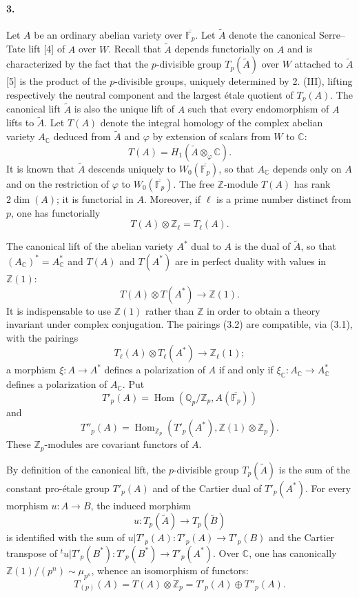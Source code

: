 \documentclass[10pt]{article}
\newcommand{\C}{\mathbb C}
\newcommand{\Fp}{\mathbb F_p}
\newcommand{\Q}{\mathbb Q}
\newcommand{\Z}{\mathbb Z}
\newcommand{\Ac}{A_{\C}}
\newcommand{\Hom}{\operatorname{Hom}}
\begin{document}
\paragraph{3.} Let $A$ be an ordinary abelian variety over $\overline{\Fp}$. Let $\widetilde A$ denote the canonical Serre--Tate lift [4] of $A$ over $W$. Recall that $\widetilde A$ depends functorially on $A$ and is characterized by the fact that the $p$-divisible group $T_p(\widetilde A)$ over $W$ attached to $\widetilde A$ [5] is the product of the $p$-divisible groups, uniquely determined by 2. (III), lifting respectively the neutral component and the largest étale quotient of $T_p(A)$. The canonical lift $\widetilde A$ is also the unique lift of $A$ such that every endomorphism of $A$ lifts to $\widetilde A$. Let $T(A)$ denote the integral homology of the complex abelian variety $\Ac$ deduced from $\widetilde A$ and $\varphi$ by extension of scalars from $W$ to $\C$:
\[
T(A)=H_1(\widetilde A\otimes_{\varphi}\C).
\]
It is known that $\widetilde A$ descends uniquely to $W_0(\overline{\Fp})$, so that $\Ac$ depends only on $A$ and on the restriction of $\varphi$ to $W_0(\overline{\Fp})$. The free $\Z$-module $T(A)$ has rank $2\dim(A)$; it is functorial in $A$. Moreover, if $\ell$ is a prime number distinct from $p$, one has functorially
\[
\tag{3.1}
T(A)\otimes\Z_\ell=T_\ell(A).
\]

The canonical lift of the abelian variety $A^*$ dual to $A$ is the dual of $\widetilde A$, so that $(\Ac)^*=A^*_{\C}$ and $T(A)$ and $T(A^*)$ are in perfect duality with values in $\Z(1)$:
\[
\tag{3.2}
T(A)\otimes T(A^*)\longrightarrow\Z(1).
\]
It is indispensable to use $\Z(1)$ rather than $\Z$ in order to obtain a theory invariant under complex conjugation. The pairings (3.2) are compatible, via (3.1), with the pairings
\[
T_\ell(A)\otimes T_\ell(A^*)\longrightarrow\Z_\ell(1);
\]
a morphism $\xi:A\to A^*$ defines a polarization of $A$ if and only if $\xi_{\C}:\Ac\to A^*_{\C}$ defines a polarization of $\Ac$. Put
\[
T'_p(A)=\Hom(\Q_p/\Z_p,A(\overline{\Fp}))
\]
and
\[
T''_p(A)=\Hom_{\Z_p}(T'_p(A^*),\Z(1)\otimes\Z_p).
\]
These $\Z_p$-modules are covariant functors of $A$.

By definition of the canonical lift, the $p$-divisible group $T_p(\widetilde A)$ is the sum of the constant pro-étale group $T'_p(A)$ and of the Cartier dual of $T'_p(A^*)$. For every morphism $u:A\to B$, the induced morphism
\[
u:T_p(\widetilde A)\to T_p(\widetilde B)
\]
is identified with the sum of $u|T'_p(A):T'_p(A)\to T'_p(B)$ and the Cartier transpose of ${}^tu|T'_p(B^*):T'_p(B^*)\to T'_p(A^*)$. Over $\C$, one has canonically $\Z(1)/(p^n)\sim\mu_{p^n}$, whence an isomorphism of functors:
\[
\tag{3.2}
T_{(p)}(A)=T(A)\otimes\Z_p=T'_p(A)\oplus T''_p(A).
\]
\end{document}
